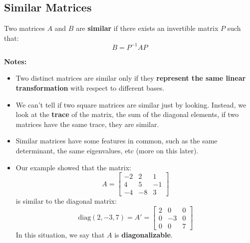\documentclass[a4paper, 9pt]{extarticle}
\begin{document}
\subsection{Similar Matrices}
\begin{definitionbox}{}{}
  Two matrices $A$ and $B$ are \textbf{similar} if there exists an invertible matrix $P$ such that:
  $$
    B = P^{-1}AP
  $$
\end{definitionbox}
\noindent \textbf{Notes:}
\begin{itemize}
  \item Two distinct matrices are similar only if they \textbf{represent the same linear transformation} with respect to different bases.
  \item We can't tell if two square matrices are similar just by looking. Instead, we look at the \textbf{trace} of the matrix, the sum of the diagonal elements, if two matrices have the same trace, they are similar.
  \item Similar matrices have some features in common, such as the same determinant, the same eigenvalues, etc (more on this later).
  \item Our example showed that the matrix:
        $$ A =
          \begin{bmatrix}
            -2 & 2  & 1  \\
            4  & 5  & -1 \\
            -4 & -8 & 3
          \end{bmatrix}$$
        is similar to the diagonal matrix:
        $$ \text{diag}(2,-3,7) = A' =
          \begin{bmatrix}
            2 & 0  & 0 \\
            0 & -3 & 0 \\
            0 & 0  & 7
          \end{bmatrix}$$
        In this situation, we say that $A$ is \textbf{diagonalizable}.
\end{itemize}
\end{document}
